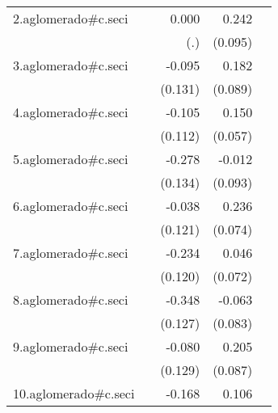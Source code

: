 {\begin{longtable}{l*{4}{D{.}{.}{-1}}}
\addlinespace
2.aglomerado#c.seci&                     &       0.000         &       0.242\sym{*}  &                     \\
            &                     &         (.)         &     (0.095)         &                     \\
\addlinespace
3.aglomerado#c.seci&                     &      -0.095         &       0.182\sym{*}  &                     \\
            &                     &     (0.131)         &     (0.089)         &                     \\
\addlinespace
4.aglomerado#c.seci&                     &      -0.105         &       0.150\sym{**} &                     \\
            &                     &     (0.112)         &     (0.057)         &                     \\
\addlinespace
5.aglomerado#c.seci&                     &      -0.278\sym{*}  &      -0.012         &                     \\
            &                     &     (0.134)         &     (0.093)         &                     \\
\addlinespace
6.aglomerado#c.seci&                     &      -0.038         &       0.236\sym{**} &                     \\
            &                     &     (0.121)         &     (0.074)         &                     \\
\addlinespace
7.aglomerado#c.seci&                     &      -0.234         &       0.046         &                     \\
            &                     &     (0.120)         &     (0.072)         &                     \\
\addlinespace
8.aglomerado#c.seci&                     &      -0.348\sym{**} &      -0.063         &                     \\
            &                     &     (0.127)         &     (0.083)         &                     \\
\addlinespace
9.aglomerado#c.seci&                     &      -0.080         &       0.205\sym{*}  &                     \\
            &                     &     (0.129)         &     (0.087)         &                     \\
\addlinespace
10.aglomerado#c.seci&                     &      -0.168         &       0.106         &                     \\

\end{longtable}}
